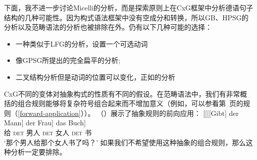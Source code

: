 下面，我不进一步讨论Micelli的分析，而是探索原则上在CxG框架中分析德语句子结构的几种可能性。因为构式语法框架中没有空成分和转换，所以GB、HPSG的分析以及范畴语法的分析也被排除在外。仍有以下几种可能的选择：
\begin{itemize}
\item 一种类似于LFG的分析，设置一个可选动词
\item 像GPSG所提出的完全扁平的分析;
\item 二叉结构分析但是动词的位置可以变化，正如\citet[]{Steedman2000a-u}的分析
\end{itemize}
%
CxG不同的变体对抽象构式的性质有不同的假设。在范畴语法中，我们有非常概括的组合规则能够将复杂符号组合起来而不增加意义（例如，可以参看第~\pageref{forward-application}页的规则（\ref{forward-application}））。 （）展示了抽象规则的前向应用：
\ea
\gll {}[[[[Gibt] der Mann] der Frau] das Buch]\\
	 {}\spacebr{}\spacebr{}\spacebr{}\spacebr{}给 \textsc{det} 男人 \textsc{det} 女人 \textsc{det} 书\\
\glt `那个男人给那个女人书了吗？'
\z
如果我们不希望使用这种抽象的组合规则，那么这种分析一定要排除。

